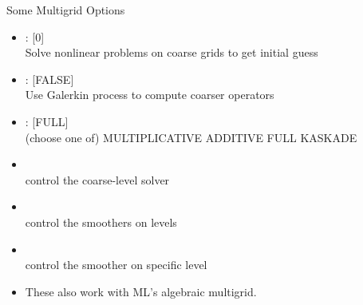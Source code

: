 


\begin{frame}{Some Multigrid Options}
  \begin{itemize}
  \item {}: [0] \\
    Solve nonlinear problems on coarse grids to get initial guess
  \item {}: [FALSE] \\
    Use Galerkin process to compute coarser operators
  \item {}: [FULL] \\
    (choose one of) MULTIPLICATIVE ADDITIVE FULL KASKADE
  \item {} \\
    control the coarse-level solver
  \item {} \\
    control the smoothers on levels
  \item {} \\
    control the smoother on specific level
  \item These also work with ML's algebraic multigrid.
  \end{itemize}
\end{frame}

